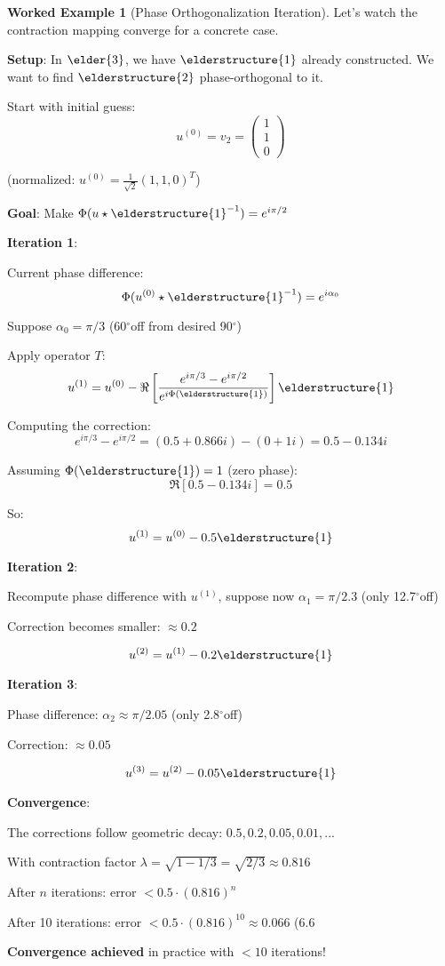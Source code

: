 \documentclass[12pt,a4paper]{article}
\newcommand{\degree}{$^\circ$}
\theoremstyle{definition}
\newtheorem{example}{Worked Example}[section]
\theoremstyle{remark}
\begin{document}
\begin{example}[Phase Orthogonalization Iteration]
Let's watch the contraction mapping converge for a concrete case.

\textbf{Setup}: In $\elder{3}$, we have $\elderstructure{1}$ already constructed. We want to find $\elderstructure{2}$ phase-orthogonal to it.

Start with initial guess:
$$u^{(0)} = v_2 = \begin{pmatrix} 1 \\ 1 \\ 0 \end{pmatrix}$$ 

(normalized: $u^{(0)} = \frac{1}{\sqrt{2}}(1, 1, 0)^T$)

\textbf{Goal}: Make $\Phi(u \star \elderstructure{1}^{-1}) = e^{i\pi/2}$

\textbf{Iteration 1}:

Current phase difference:
$$\Phi(u^{(0)} \star \elderstructure{1}^{-1}) = e^{i\alpha_0}$$

Suppose $\alpha_0 = \pi/3$ (60\degree off from desired 90\degree)

Apply operator $T$:
$$u^{(1)} = u^{(0)} - \Re\left[\frac{e^{i\pi/3} - e^{i\pi/2}}{e^{i\Phi(\elderstructure{1})}}\right] \elderstructure{1}$$

Computing the correction:
$$e^{i\pi/3} - e^{i\pi/2} = (0.5 + 0.866i) - (0 + 1i) = 0.5 - 0.134i$$

Assuming $\Phi(\elderstructure{1}) = 1$ (zero phase):
$$\Re[0.5 - 0.134i] = 0.5$$

So:
$$u^{(1)} = u^{(0)} - 0.5 \elderstructure{1}$$

\textbf{Iteration 2}:

Recompute phase difference with $u^{(1)}$, suppose now $\alpha_1 = \pi/2.3$ (only 12.7\degree off)

Correction becomes smaller: $\approx 0.2$

$$u^{(2)} = u^{(1)} - 0.2 \elderstructure{1}$$

\textbf{Iteration 3}:

Phase difference: $\alpha_2 \approx \pi/2.05$ (only 2.8\degree off)

Correction: $\approx 0.05$

$$u^{(3)} = u^{(2)} - 0.05 \elderstructure{1}$$

\textbf{Convergence}:

The corrections follow geometric decay: $0.5, 0.2, 0.05, 0.01, ...$

With contraction factor $\lambda = \sqrt{1 - 1/3} = \sqrt{2/3} \approx 0.816$

After $n$ iterations: error $< 0.5 \cdot (0.816)^n$

After 10 iterations: error $< 0.5 \cdot (0.816)^{10} \approx 0.066$ (6.6%

\textbf{Convergence achieved} in practice with $<10$ iterations!
\end{example}
\end{document}
